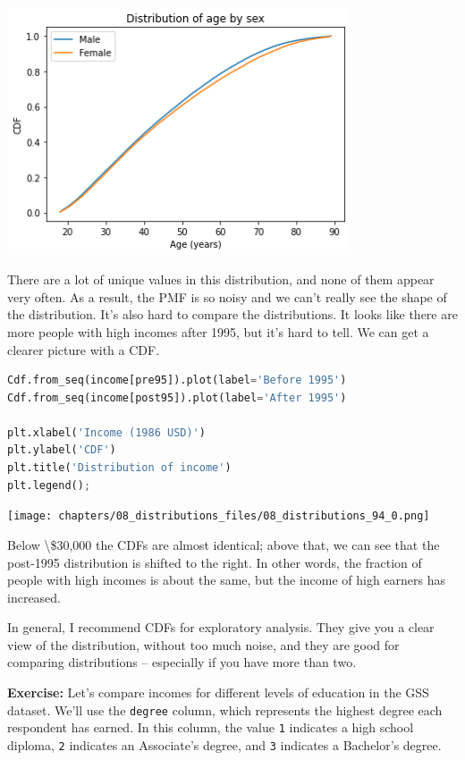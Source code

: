 \begin{center}
\includegraphics[width=4in]{chapters/08_distributions_files/08_distributions_92_0.png}
\end{center}

There are a lot of unique values in this distribution, and none of them
appear very often. As a result, the PMF is so noisy and we can't really
see the shape of the distribution. It's also hard to compare the
distributions. It looks like there are more people with high incomes
after 1995, but it's hard to tell. We can get a clearer picture with a
CDF.

\begin{lstlisting}[language=Python,style=source]
Cdf.from_seq(income[pre95]).plot(label='Before 1995')
Cdf.from_seq(income[post95]).plot(label='After 1995')

plt.xlabel('Income (1986 USD)')
plt.ylabel('CDF')
plt.title('Distribution of income')
plt.legend();
\end{lstlisting}

\begin{center}
\texttt{[image: chapters/08\_distributions\_files/08\_distributions\_94\_0.png]}
\end{center}

Below \textbackslash\$30,000 the CDFs are almost identical; above that,
we can see that the post-1995 distribution is shifted to the right. In
other words, the fraction of people with high incomes is about the same,
but the income of high earners has increased.

In general, I recommend CDFs for exploratory analysis. They give you a
clear view of the distribution, without too much noise, and they are
good for comparing distributions -- especially if you have more than
two.

\textbf{Exercise:} Let's compare incomes for different levels of
education in the GSS dataset. We'll use the
\passthrough{\lstinline!degree!} column, which represents the highest
degree each respondent has earned. In this column, the value
\passthrough{\lstinline!1!} indicates a high school diploma,
\passthrough{\lstinline!2!} indicates an Associate's degree, and
\passthrough{\lstinline!3!} indicates a Bachelor's degree.

